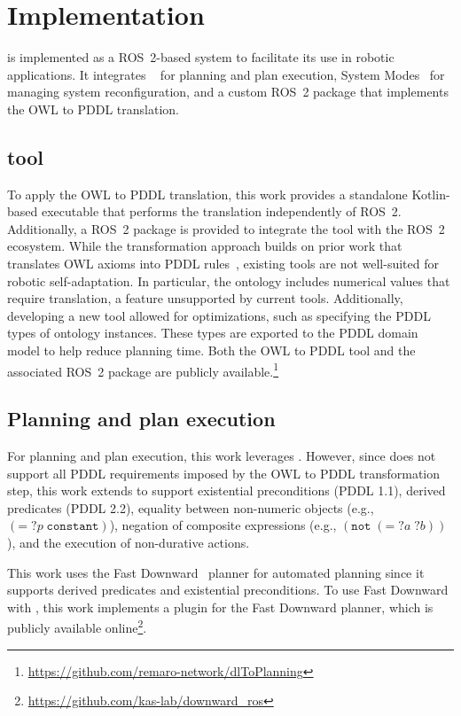\section{Implementation}\label{planta:sec:implementation}

\planta is implemented as a ROS~2-based system to facilitate its use in robotic applications. It integrates \plansys~\cite{plansys2} for planning and plan execution, System Modes~\cite{nordmannSystemModes2021} for managing system reconfiguration, and a custom ROS~2 package that implements the OWL to PDDL translation.

\subsection{\owltopddl tool}
To apply the OWL to PDDL translation, this work provides a standalone Kotlin-based executable that performs the translation independently of ROS~2. Additionally, a ROS~2 package is provided to integrate the tool with the ROS~2 ecosystem. While the transformation approach builds on prior work that translates OWL axioms into PDDL rules~\cite{DBLP:conf/aaai/Borgwardt0KKNS22}, existing tools are not well-suited for robotic self-adaptation. In particular, the \pddltomasys ontology includes numerical values that require translation, a feature unsupported by current tools. Additionally, developing a new tool allowed for optimizations, such as specifying the PDDL types of ontology instances. These types are exported to the PDDL domain model to help reduce planning time. Both the OWL to PDDL tool and the associated ROS~2 package are publicly available.\footnote{\url{https://github.com/remaro-network/dlToPlanning}}

\subsection{Planning and plan execution}\label{planta:sec:impl_plansys}

For planning and plan execution, this work leverages \plansys. However, since \plansys does not support all PDDL requirements imposed by the OWL to PDDL transformation step, this work extends \plansys to support existential preconditions (PDDL 1.1), derived predicates (PDDL 2.2), equality between non-numeric objects (e.g., $(\texttt{=}\; ?p\; \texttt{constant})$), negation of composite expressions (e.g., $(\texttt{not}\; (\texttt{=}\; ?a\; ?b))$), and the execution of non-durative actions.

This work uses the Fast Downward~\cite{helmert2006fast} planner for automated planning since it supports derived predicates and existential preconditions. To use Fast Downward with \plansys, this work implements a \plansys plugin for the Fast Downward planner, which is publicly available online\footnote{\url{https://github.com/kas-lab/downward_ros}}.

